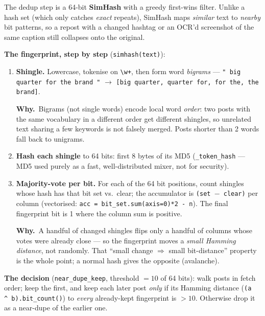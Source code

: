 \documentclass[11pt,a4paper]{article}
\newcommand{\why}[1]{%
  \par\vspace{2pt}%
  \noindent\colorbox{mist}{\begin{minipage}{\dimexpr\linewidth-2\fboxsep}%
  \textcolor{accent2}{\textbf{Why.}}~#1\end{minipage}}\par\vspace{3pt}}
\newcommand{\code}[1]{\texttt{\small #1}}
\begin{document}
The dedup step is a 64-bit \textbf{SimHash} with a greedy first-wins filter. Unlike a hash
set (which only catches \emph{exact} repeats), SimHash maps \emph{similar} text to \emph{nearby}
bit patterns, so a repost with a changed hashtag or an OCR'd screenshot of the same caption
still collapses onto the original.

\smallskip
\noindent\textbf{The fingerprint, step by step} (\code{simhash(text)}):
\begin{enumerate}
\item \textbf{Shingle.} Lowercase, tokenise on \code{\textbackslash w+}, then form word
\emph{bigrams} --- \code{"\,big quarter for the brand\,"} $\rightarrow$
\code{[big quarter, quarter for, for the, the brand]}. \why{Bigrams (not single words)
encode local word \emph{order}: two posts with the same vocabulary in a different order get
different shingles, so unrelated text sharing a few keywords is not falsely merged. Posts
shorter than 2 words fall back to unigrams.}
\item \textbf{Hash each shingle} to 64 bits: first 8 bytes of its MD5
(\code{\_token\_hash} --- MD5 used purely as a fast, well-distributed mixer, not for security).
\item \textbf{Majority-vote per bit.} For each of the 64 bit positions, count shingles whose
hash has that bit set vs.\ clear; the accumulator is \code{(set\,$-$\,clear)} per column
(vectorised: \code{acc = bit\_set.sum(axis=0)*2 - n}). The final fingerprint bit is 1 where the
column sum is positive. \why{A handful of changed shingles flips only a handful of columns whose
votes were already close --- so the fingerprint moves a \emph{small Hamming distance}, not
randomly. That ``small change $\Rightarrow$ small bit-distance'' property is the whole point;
a normal hash gives the opposite (avalanche).}
\end{enumerate}

\noindent\textbf{The decision} (\code{near\_dupe\_keep}, threshold $=10$ of 64 bits):
walk posts in fetch order; keep the first, and keep each later post \emph{only} if its
Hamming distance (\code{(a\,\^{}\,b).bit\_count()}) to \emph{every} already-kept fingerprint
is $>10$. Otherwise drop it as a near-dupe of the earlier one.
\end{document}
